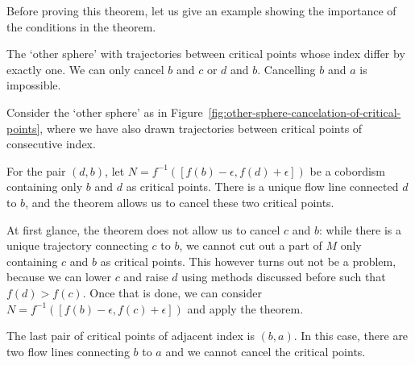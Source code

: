 Before proving this theorem, let us give an example showing the importance of the conditions in the theorem.
\begin{marginfigure}
    \centering
    \caption{The `other sphere' with trajectories between critical points whose index differ by exactly one. We can only cancel $b$ and $c$ or $d$ and $b$. Cancelling $b$ and $a$ is impossible.}
    \label{fig:other-sphere-cancelation-of-critical-points}
\end{marginfigure}
\begin{eg}
    Consider the `other sphere' as in Figure~\ref{fig:other-sphere-cancelation-of-critical-points}, where we have also drawn trajectories between critical points of consecutive index. 

    For the pair $(d, b)$, let $N = f^{-1}([f(b) - \epsilon, f(d) + \epsilon])$ be a cobordism containing only $b$ and $d$ as critical points.
    There is a unique flow line connected $d$ to $b$, and the theorem allows us to cancel these two critical points.

    At first glance, the theorem does not allow us to cancel $c$ and  $b$: while there is a unique trajectory connecting $c$ to  $b$, we cannot cut out a part of $M$ only containing $c$ and  $b$ as critical points.
    This however turns out not be a problem, because we can lower $c$ and raise $d$ using methods discussed before such that $f(d) > f(c)$. Once that is done, we can consider $N = f^{-1}([f(b) - \epsilon, f(c) + \epsilon])$ and apply the theorem.

    The last pair of critical points of adjacent index  is $(b, a)$.
    In this case, there are two flow lines connecting  $b$ to $a$ and  we cannot cancel the critical points.
\end{eg}



